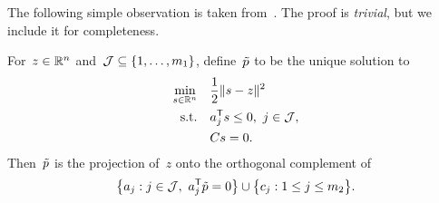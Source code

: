 The following simple observation is taken from~\cite[\S~3]{Powell_2015}.
The proof is \emph{trivial}, but we include it for completeness.

\begin{lemma}
    \label{lem:bvtcg}
    For~$z \in \mathbb{R}^n$ and~$\mathcal{J} \subseteq \{1, \dots, m_1\}$, define~$\tilde{\pstep}$ to be the unique solution to
    \begin{subequations}
        \label{eq:lctcg-lemma}
        \begin{align}
            \min_{\sstep \in \R^n}  & \quad \frac{1}{2} \norm{\sstep - z}^2\\
            \text{s.t.}             & \quad a_j^{\T} \sstep \le 0, ~ j \in \mathcal{J},\\
                                    & \quad C \sstep = 0.
        \end{align}
    \end{subequations}
    Then~$\tilde{\pstep}$ is the projection of~$z$ onto the orthogonal complement of
    \begin{equation*}
        \set[\big]{a_j : j \in \mathcal{J}, ~ a_j^{\T} \tilde{\pstep} = 0} \cup \set[\big]{c_j : 1 \le j \le m_2}.
    \end{equation*}
\end{lemma}

